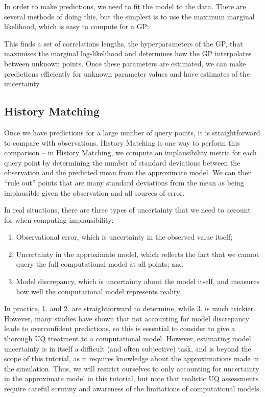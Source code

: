 \documentclass[openacc]{rstransa}%
\begin{document}
In order to make predictions, we need to fit the model to the data. There are several methods of doing this, but the simplest is to use the maximum marginal likelihood, which is easy to compute for a GP:

This finds a set of correlations lengths, the hyperparameters of the GP, that maximises the marginal log-likelihood and determines how the GP interpolates between unknown points. Once these parameters are estimated, we can make predictions efficiently for unknown parameter values and have estimates of the uncertainty.

\subsection{History Matching}

Once we have predictions for a large number of query points, it is straightforward to compare with observations. History Matching is one way to perform this comparison -- in History Matching, we compute an implausibility metric for each query point by determining the number of standard deviations between the observation and the predicted mean from the approximate model. We can then ``rule out'' points that are many standard deviations from the mean as being implausible given the observation and all sources of error.

In real situations, there are three types of uncertainty that we need to account for when computing implausibility:

\begin{enumerate}
\item Observational error, which is uncertainty in the observed value itself;
\item Uncertainty in the approximate model, which reflects the fact that we cannot query the full computational model at all points; and
\item Model discrepancy, which is uncertainty about the model itself, and measures how well the computational model represents reality.
\end{enumerate}

In practice, 1. and 2. are straightforward to determine, while 3. is much trickier. However, many studies have shown that not accounting for model discrepancy leads to overconfident predictions, so this is essential to consider to give a thorough UQ treatment to a computational model. However, estimating model uncertainty is in itself a difficult (and often subjective) task, and is beyond the scope of this tutorial, as it requires knowledge about the approximations made in the simulation. Thus, we will restrict ourselves to only accounting for uncertainty in the approximate model in this tutorial, but note that realistic UQ assessments require careful scrutiny and awareness of the limitations of computational models.
\end{document}
